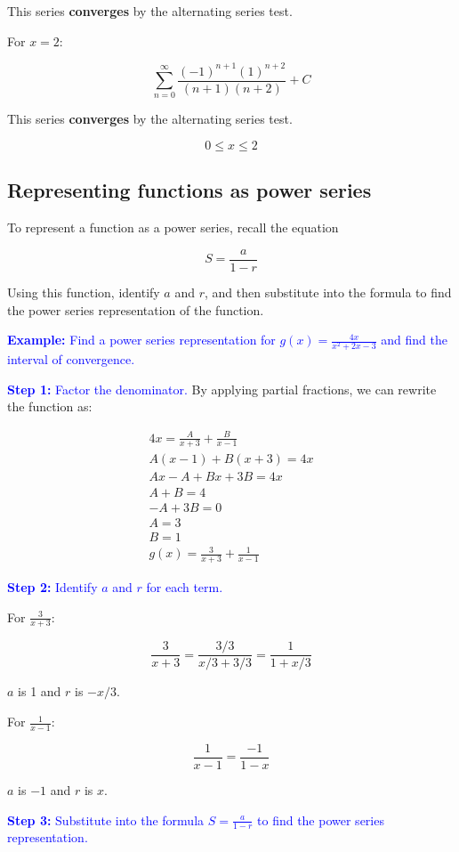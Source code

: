 \documentclass[letterpaper, 12pt]{article}
\newcommand{\example}[1]{\textcolor{blue}{\textbf{Example:} #1}}
\newcommand{\step}[2]{\textcolor{blue}{\textbf{Step #1:} #2}}
\begin{document}
This series \textbf{converges} by the alternating series test.

For $x=2$:

$$\displaystyle \sum_{n=0}^\infty \frac{(-1)^{n+1}(1)^{n+2}}{(n+1)(n+2)} + C$$

This series \textbf{converges} by the alternating series test.

$$\boxed{ 0 \leq x \leq 2}$$

\subsection*{Representing functions as power series}

To represent a function as a power series, recall the equation

$$S = \frac{a}{1-r}$$

Using this function, identify $a$ and $r$, and then substitute into the formula to find the power series representation of the function.

\example{Find a power series representation for $\displaystyle g(x) = \frac{4x}{x^2+2x-3}$ and find the interval of convergence.}

\step{1}{Factor the denominator.} By applying partial fractions, we can rewrite the function as:

\begin{gather*}
4x = \frac{A}{x+3} + \frac{B}{x-1} \\
A(x-1) + B(x+3) = 4x \\
Ax - A + Bx + 3B = 4x \\
A + B = 4 \\
- A + 3B = 0 \\
A = 3 \\
B = 1 \\
g(x) = \frac{3}{x+3} + \frac{1}{x-1}
\end{gather*}

\step{2}{Identify $a$ and $r$ for each term.}

For $\displaystyle \frac{3}{x+3}$:

$$\frac{3}{x+3} = \frac{3/3}{x/3+3/3} = \frac{1}{1+x/3}$$

$a$ is 1 and $r$ is $-x/3$.

For $\displaystyle \frac{1}{x-1}$:

$$\frac{1}{x-1} = \frac{-1}{1-x}$$

$a$ is $-1$ and $r$ is $x$.

\step{3}{Substitute into the formula $S = \frac{a}{1-r}$ to find the power series representation.}
\end{document}
